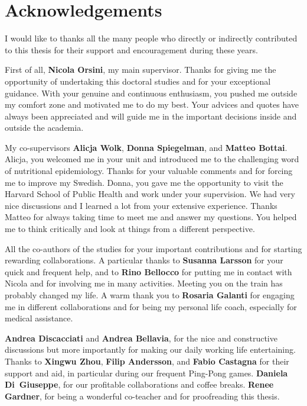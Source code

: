 %

\chapter{Acknowledgements}

I would like to thanks all the many people who directly or indirectly contributed to this thesis for their support and encouragement during these years. 
\medskip

First of all, \textbf{Nicola Orsini}, my main supervisor. Thanks for giving me the opportunity of undertaking this doctoral studies and for your exceptional guidance. With your genuine and continuous enthusiasm, you pushed me outside my comfort zone and motivated me to do my best. Your advices and quotes have always been  appreciated and will guide me in the important decisions inside and outside the academia. 
\medskip

My co-supervisors \textbf{Alicja Wolk}, \textbf{Donna Spiegelman}, and \textbf{Matteo Bottai}. Alicja, you welcomed me in your unit and introduced me to the challenging word of nutritional epidemiology. Thanks for your valuable comments and for forcing me to improve my Swedish. Donna, you gave me the opportunity to visit the Harvard School of Public Health and work under your supervision. We had very nice discussions and I learned a lot from your extensive experience. Thanks Matteo for always taking time to meet me and answer my questions. You helped me to think critically and look at things from a different perspective.

\medskip
All the co-authors of the studies for your important contributions and for starting rewarding collaborations. A particular thanks to \textbf{Susanna Larsson} for your quick and frequent help, and to \textbf{Rino Bellocco} for putting me in contact with Nicola and for involving me in many activities. Meeting you on the train has probably changed my life. A warm thank you to \textbf{Rosaria Galanti} for engaging me in different collaborations and for being my personal life coach, especially for medical assistance.
\medskip

\textbf{Andrea Discacciati} and \textbf{Andrea Bellavia}, for the nice and constructive discussions but more importantly for making our daily working life entertaining. Thanks to \textbf{Xingwu Zhou}, \textbf{Filip Andersson}, and \textbf{Fabio Castagna} for their support and aid, in particular during our frequent Ping-Pong games. \textbf{Daniela Di~Giuseppe}, for our profitable collaborations and coffee breaks. \textbf{Renee Gardner}, for being a wonderful co-teacher and for proofreading this thesis.
\medskip


